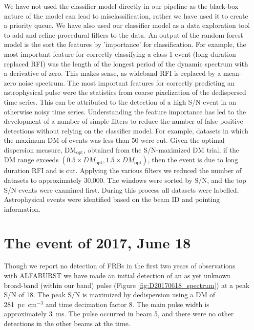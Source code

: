 \documentclass[a4paper,fleqn,usenatbib]{mnras}
\begin{document}
We have not used the classifier model directly in our pipeline as the black-box
nature of the model can lead to misclassification, rather we have used it to
create a priority queue.  We have also used our classifier model as a data
exploration tool to add and refine procedural filters to the data.  An output of
the random forest model is the sort the features by 'importance' for
classification. For example, the most important feature for correctly
classifying a class 1 event (long duration replaced RFI) was the length of the
longest period of the dynamic spectrum with a derivative of zero. This makes
sense, as wideband RFI is replaced by a mean-zero noise spectrum. The most
important features for correctly predicting an astrophysical pulse were the
statistics from coarse pixelization of the dedispersed time series. This can be
attributed to the detection of a high S/N event in an otherwise noisy time series.
Understanding the feature importance has led to the development of a number of
simple filters to reduce the number of false-positive detections without relying
on the classifier model. For example, datasets in which the maximum DM of events
was less than 50 were cut.  Given the optimal dispersion measure,
DM$_{\textrm{opt}}$, obtained from the S/N-maximized DM trial,  if the DM range
exceeds $(0.5 \times DM_{\textrm{opt}}, 1.5 \times DM_{\textrm{opt}})$, then the
event is due to long duration RFI and is cut.  Applying the various filters we
reduced the number of datasets to approximately 30,000. The windows were sorted
by S/N, and the top S/N events were examined first.  During this process all
datasets were labelled.  Astrophysical events were identified based on the beam
ID and pointing information.



\section{The event of 2017, June 18}
\label{sec:18062017}

Though we report no detection of FRBs in the first two years of observations
with ALFABURST we have made an initial detection of an as yet unknown broad-band
(within our band) pulse (Figure \ref{fig:D20170618_spectrum}) at a peak S/N of
18. The peak S/N is maximized by dedispersion using a DM of 281~pc~cm$^{-3}$ and
time decimation factor 8. The main pulse width is approximately 3~ms. The pulse
occurred in beam 5, and there were no other detections in the other beams at the
time.
\end{document}
